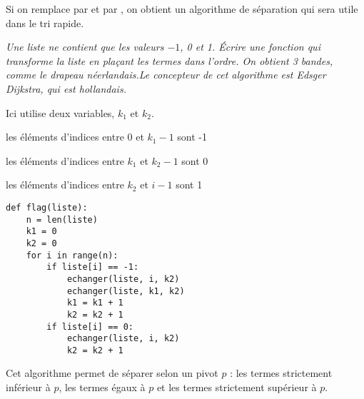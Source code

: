 Si on remplace  par  et  par , on obtient un algorithme de séparation qui sera utile dans le tri rapide.
\begin{Exercise}[title= Drapeau hollandais]\it
Une liste ne contient que les valeurs $-1$, 0 et 1. Écrire une fonction qui transforme la liste en plaçant les termes dans l'ordre. On obtient 3 bandes, comme le drapeau néerlandais.Le concepteur de cet algorithme est  Edsger Dijkstra, qui est hollandais.
\end{Exercise}
\begin{Answer}
Ici utilise deux variables, $k_1$ et $k_2$.

les éléments d'indices entre 0 et $k_1-1$ sont -1

les éléments d'indices entre $k_1$ et $k_2-1$ sont 0

les éléments d'indices entre $k_2$ et $i-1$ sont 1

\begin{lstlisting}
def flag(liste):
    n = len(liste)
    k1 = 0
    k2 = 0
    for i in range(n):
        if liste[i] == -1:
            echanger(liste, i, k2)
            echanger(liste, k1, k2)
            k1 = k1 + 1
            k2 = k2 + 1
        if liste[i] == 0:
            echanger(liste, i, k2)
            k2 = k2 + 1
\end{lstlisting}
\end{Answer}
\medskip

Cet algorithme permet de séparer selon un pivot $p$ : les termes strictement inférieur à $p$, les termes égaux à $p$ et les termes strictement supérieur à $p$.













